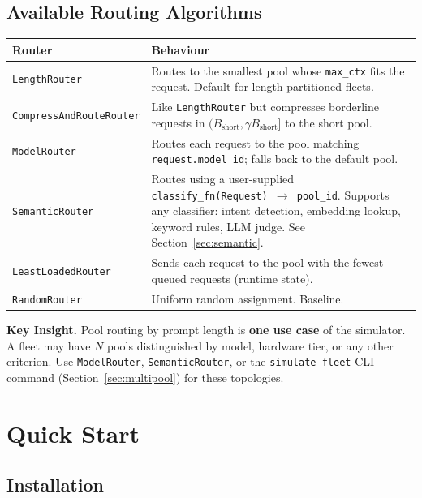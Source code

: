 \documentclass[11pt,a4paper]{article}
\newenvironment{keyinsight}
  {\begin{mdframed}[backgroundcolor=blue!5!white,linecolor=blue!60!black,linewidth=1pt]
   \textbf{Key Insight. }\ignorespaces}
  {\end{mdframed}}
\newcommand{\Bshort}{B_{\text{short}}}
\begin{document}
\subsection{Available Routing Algorithms}
\label{sec:routing}

\begin{center}
\begin{tabular}{lp{9cm}}
\toprule
Router & Behaviour \\
\midrule
\texttt{LengthRouter} & Routes to the smallest pool whose \texttt{max\_ctx}
  fits the request.  Default for length-partitioned fleets. \\
\texttt{CompressAndRouteRouter} & Like \texttt{LengthRouter} but compresses
  borderline requests in $(\Bshort, \gamma\Bshort]$ to the short pool. \\
\texttt{ModelRouter} & Routes each request to the pool matching
  \texttt{request.model\_id}; falls back to the default pool. \\
\texttt{SemanticRouter} & Routes using a user-supplied
  \texttt{classify\_fn(Request) $\to$ pool\_id}.  Supports any
  classifier: intent detection, embedding lookup, keyword rules, LLM
  judge.  See Section~\ref{sec:semantic}. \\
\texttt{LeastLoadedRouter} & Sends each request to the pool with the
  fewest queued requests (runtime state). \\
\texttt{RandomRouter} & Uniform random assignment.  Baseline. \\
\bottomrule
\end{tabular}
\end{center}

\begin{keyinsight}
  Pool routing by prompt length is \textbf{one use case} of the
  simulator.  A fleet may have $N$ pools distinguished by model,
  hardware tier, or any other criterion.  Use \texttt{ModelRouter},
  \texttt{SemanticRouter}, or the \texttt{simulate-fleet} CLI command
  (Section~\ref{sec:multipool}) for these topologies.
\end{keyinsight}

\section{Quick Start}
\label{sec:quickstart}

\subsection{Installation}
\end{document}
